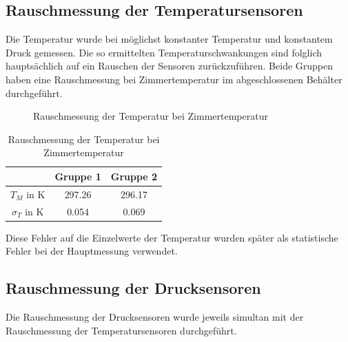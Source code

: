 \documentclass[12pt,a4paper]{article}
\begin{document}
\subsection{Rauschmessung der Temperatursensoren}
Die Temperatur wurde bei möglichst konstanter Temperatur und konstantem Druck gemessen. Die so ermittelten Temperaturschwankungen sind folglich hauptsächlich auf ein Rauschen der Sensoren zurückzuführen. 
Beide Gruppen haben eine Rauschmessung bei Zimmertemperatur im abgeschlossenen Behälter durchgeführt.


\begin{figure}[H]
\caption{Rauschmessung der Temperatur bei Zimmertemperatur}
\end{figure}

\begin{table}[H]\centering
\caption{Rauschmessung der Temperatur bei Zimmertemperatur}
\begin{tabular}{c|c|c}
 & Gruppe 1 & Gruppe 2 \\ 
\hline 
$T_M$ in K & 297.26 & 296.17 \\ 
$\sigma_T$ in K & 0.054 & 0.069 \\  
\end{tabular} 
\end{table}

Diese Fehler auf die Einzelwerte der Temperatur wurden später als statistische Fehler bei der Hauptmessung verwendet.
\subsection{Rauschmessung der Drucksensoren}
Die Rauschmessung der Drucksensoren wurde jeweils simultan mit der Rauschmessung der Temperatursensoren durchgeführt.
\end{document}
